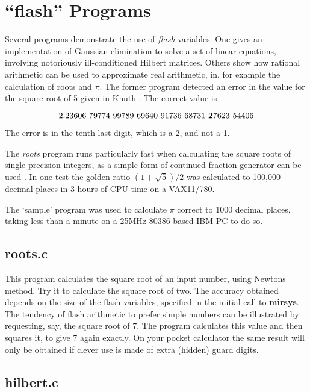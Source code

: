       \section{``flash'' Programs}

      Several programs demonstrate the use of {\em flash} variables.  One gives 
      an implementation of Gaussian elimination to solve a  set  of  linear 
      equations,  involving  notoriously  ill-conditioned Hilbert matrices.  
      Others show how rational arithmetic can be used to  approximate  real 
      arithmetic,  in,  for  example  the calculation of roots and $\pi$.  The 
      former program detected an error in the value for the square root  of 
      5 given in Knuth \cite[appendix A]{Knuth81}. The correct value is 

       $$ 2.23606\ 79774\ 99789\ 69640\ 91736\ 68731\ {\bf 2}7623\ 54406 $$ 
    
      The error is in the tenth last digit, which is a 2, and not a 1.

      The  {\em roots} program runs particularly fast when calculating the square 
      roots of single precision integers,  as a simple  form  of  continued 
      fraction generator can be used \cite{Scott87}. In one test  the  golden 
      ratio  $(1+\sqrt{5})/2$  was calculated to 100,000 decimal places in 
      3 hours of CPU time on a VAX11/780.  

      The `sample' program was used to calculate $\pi$ correct to 1000 decimal 
      places, taking less than a minute on a 25MHz 80386-based IBM PC to do so.

      \subsection{roots.c}

      This program calculates the square root of  an  input  number,  using 
      Newtons method. Try it to calculate the square root of two. The 
      accuracy  obtained  depends  on  the  size  of  the  flash variables, 
      specified in the initial call to {\bf mirsys}.  The tendency of flash arithmetic to 
      prefer  simple  numbers  can be illustrated by requesting,  say,  the 
      square root of 7.  The program calculates this value and then squares 
      it,  to give 7 again exactly.  On your  pocket  calculator  the  same 
      result  will only be obtained if clever use is made of extra (hidden) 
      guard digits.  


      \subsection{hilbert.c}

